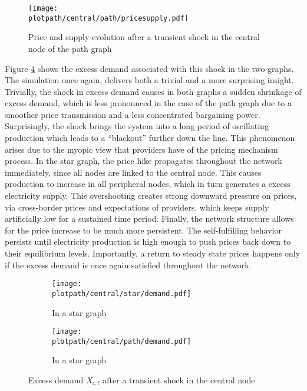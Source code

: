 \begin{figure}[H]
  \centering
  \texttt{[image: \\plotpath/central/path/pricesupply.pdf]}
  \caption{Price and supply evolution after a transient shock in the central node of the path graph} \label{fig:transshockcen_path}
\end{figure}
\newpage

Figure \ref{fig:demandshock} shows the excess demand associated with this shock in the two graphs. The simulation once again, delivers both a trivial and a more surprising insight. Trivially, the shock in excess demand causes in both graphs a sudden shrinkage of excess demand, which is less pronounced in the case of the path graph due to a smoother price transmission and a less concentrated bargaining power. Surprisingly, the shock brings the system into a long period of oscillating production which leads to a ``blackout'' further down the line. This phenomenon arises due to the myopic view that providers have of the pricing mechanism process. In the star graph, the price hike propagates throughout the network immediately, since all nodes are linked to the central node. This causes production to increase in all peripheral nodes, which in turn generates a excess electricity supply. This overshooting creates strong downward pressure on prices, via cross-border prices and expectations of providers, which keeps supply artificially low for a sustained time period. Finally, the network structure allows for the price increase to be much more persistent. The self-fulfilling behavior persists until electricity production is high enough to push prices back down to their equilibrium levels. Importantly, a return to steady state prices happens only if the excess demand is once again satisfied throughout the network.

\begin{center}
  \begin{figure}[H]
    \begin{subfigure}{0.475\textwidth}
      \centering
      \texttt{[image: \\plotpath/central/star/demand.pdf]}
      \caption{In a star graph} \label{fig:demandshock_star}
    \end{subfigure} \hfill
    \begin{subfigure}{0.475\textwidth}
      \centering
      \texttt{[image: \\plotpath/central/path/demand.pdf]}
      \caption{In a star graph} \label{fig:demandshock_path}
    \end{subfigure}
    \caption{Excess demand $X_{i, t}$ after a transient shock in the central node} \label{fig:demandshock}
  \end{figure}
\end{center}

